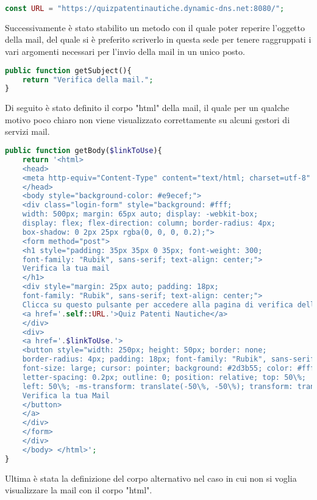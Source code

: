  \begin{lstlisting}[language=php]
	const URL = "https://quizpatentinautiche.dynamic-dns.net:8080/";
 \end{lstlisting}
 
  Successivamente è stato stabilito un metodo con il quale poter reperire l'oggetto della mail, del quale si è preferito scriverlo in questa sede per tenere raggruppati i vari argomenti necessari per l'invio della mail in un unico posto.\\
 
\begin{lstlisting}[language=php]
public function getSubject(){
	return "Verifica della mail.";
}
\end{lstlisting}

Di seguito è stato definito il corpo "html" della mail, il quale per un qualche motivo poco chiaro non viene visualizzato correttamente su alcuni gestori di servizi mail. \\

\begin{lstlisting}[language=php]
public function getBody($linkToUse){
	return '<html>
	<head>
	<meta http-equiv="Content-Type" content="text/html; charset=utf-8" />
	</head>
	<body style="background-color: #e9ecef;">
	<div class="login-form" style="background: #fff;
	width: 500px; margin: 65px auto; display: -webkit-box;
	display: flex; flex-direction: column; border-radius: 4px;
	box-shadow: 0 2px 25px rgba(0, 0, 0, 0.2);">
	<form method="post">
	<h1 style="padding: 35px 35px 0 35px; font-weight: 300;
	font-family: "Rubik", sans-serif; text-align: center;">
	Verifica la tua mail
	</h1>
	<div style="margin: 25px auto; padding: 18px;
	font-family: "Rubik", sans-serif; text-align: center;">
	Clicca su questo pulsante per accedere alla pagina di verifica della mail inserita su:
	<a href='.self::URL.'>Quiz Patenti Nautiche</a>
	</div>
	<div>
	<a href='.$linkToUse.'>
	<button style="width: 250px; height: 50px; border: none;
	border-radius: 4px; padding: 18px; font-family: "Rubik", sans-serif;
	font-size: large; cursor: pointer; background: #2d3b55; color: #fff;
	letter-spacing: 0.2px; outline: 0; position: relative; top: 50\%;
	left: 50\%; -ms-transform: translate(-50\%, -50\%); transform: translate(-50\%, -50\%);">
	Verifica la tua Mail
	</button>
	</a>
	</div>
	</form>
	</div>
	</body>	</html>';
}
 \end{lstlisting}
 
 Ultima è stata la definizione del corpo alternativo nel caso in cui non si voglia visualizzare la mail con il corpo "html".\\
 
